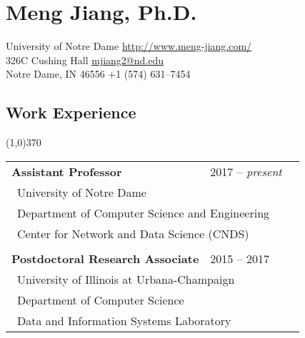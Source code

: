\documentclass[10pt]{article}
\begin{document}
\setcounter{secnumdepth}{0}

\thispagestyle{firststyle}

\section{\LARGE{\sc Meng Jiang, Ph.D.}}
University of Notre Dame \hfill \url{http://www.meng-jiang.com/} \\
326C Cushing Hall \hfill \url{mjiang2@nd.edu}\\
Notre Dame, IN 46556 \hfill +1 (574) 631--7454



\subsection{\sc Work Experience}
\vspace{-0.4cm} \line(1,0){370} \vspace{0.1cm}

\begin{table}[h!]
\begin{tabular*}{12.7cm}{p{10.0cm}p{3.25cm}r}
\bf{Assistant Professor}&2017 -- \emph{present}\\
 \multicolumn{2}{l}{~{University of Notre Dame}}\\
 \multicolumn{2}{l}{~{Department of Computer Science and Engineering}}\\
 \multicolumn{2}{l}{~{Center for Network and Data Science (CNDS)}}\\
\\
\bf{Postdoctoral Research Associate}&2015 -- 2017\\
 \multicolumn{2}{l}{~{University of Illinois at Urbana-Champaign}}\\
 \multicolumn{2}{l}{~{Department of Computer Science}}\\
 \multicolumn{2}{l}{~{Data and Information Systems Laboratory}}
\end{tabular*}
\end{table}
\vspace{-0.4cm}
\end{document}
